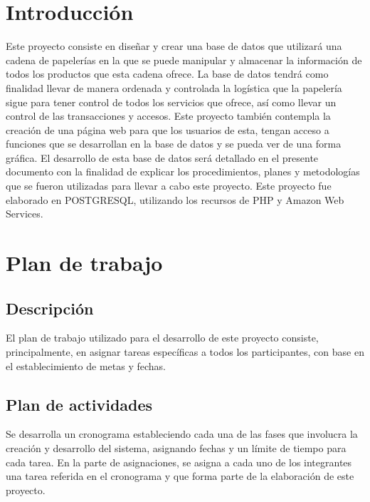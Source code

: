 \documentclass[12pt,letterpaper]{article}
\begin{document}
	\restoregeometry
	\tableofcontents

	\newpage
	\section{Introducción}
	Este proyecto consiste en diseñar y crear una base de datos que utilizará una cadena de papelerías en la que se puede manipular y almacenar la información de todos los productos que esta cadena ofrece. La base de datos tendrá como finalidad llevar de manera	ordenada y controlada la logística que la papelería sigue para tener control de todos los servicios que ofrece, así como llevar un control de las transacciones y accesos. Este proyecto también contempla la creación de una página web para que los usuarios de esta,	tengan acceso a funciones que se desarrollan en la base de datos y se pueda ver de una forma gráfica. El desarrollo de esta base de datos será detallado en el presente documento con la finalidad de explicar los procedimientos, planes y metodologías que se fueron utilizadas para llevar a cabo este proyecto. Este proyecto fue elaborado en POSTGRESQL, utilizando los recursos de PHP y Amazon Web Services.
	
	\section{Plan de trabajo}
		\subsection{Descripción}
			El plan de trabajo utilizado para el desarrollo de este proyecto consiste, principalmente, en asignar tareas específicas a todos los participantes, con base en el establecimiento de metas y fechas.
		\subsection{Plan de actividades}
			Se desarrolla un cronograma estableciendo cada una de las fases que involucra la creación y desarrollo del sistema, asignando fechas y un límite de tiempo para cada tarea. En la parte de asignaciones, se asigna a cada uno de los integrantes una tarea referida en el cronograma y que forma parte de la elaboración de este proyecto.
		\newpage
\end{document}
